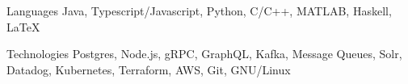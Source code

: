 

\begin{cvskills}

  \cvskill
    {Languages} %
    {Java, Typescript/Javascript, Python, C/C++, MATLAB, Haskell, LaTeX} %

  \cvskill
    {Technologies} %
    {Postgres, Node.js, gRPC, GraphQL, Kafka, Message Queues, Solr, Datadog, Kubernetes, Terraform, AWS, Git, GNU/Linux} %

\end{cvskills}

